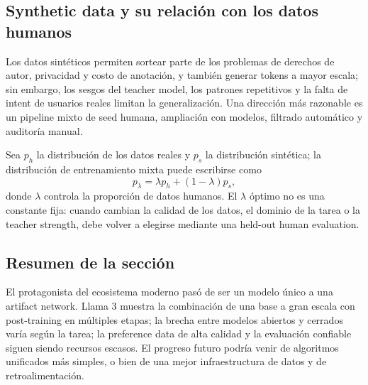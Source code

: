 
\subsection{Synthetic data y su relación con los datos humanos}

Los datos sintéticos permiten sortear parte de los problemas de derechos de autor, privacidad y costo de anotación, y también generar tokens a mayor escala; sin embargo, los sesgos del teacher model, los patrones repetitivos y la falta de intent de usuarios reales limitan la generalización. Una dirección más razonable es un pipeline mixto de seed humana, ampliación con modelos, filtrado automático y auditoría manual.

Sea $p_h$ la distribución de los datos reales y $p_s$ la distribución sintética; la distribución de entrenamiento mixta puede escribirse como
\[
p_{\lambda}=\lambda p_h+(1-\lambda)p_s,
\]
donde $\lambda$ controla la proporción de datos humanos. El $\lambda$ óptimo no es una constante fija: cuando cambian la calidad de los datos, el dominio de la tarea o la teacher strength, debe volver a elegirse mediante una held-out human evaluation.


\subsection{Resumen de la sección}

El protagonista del ecosistema moderno pasó de ser un modelo único a una artifact network. Llama 3 muestra la combinación de una base a gran escala con post-training en múltiples etapas; la brecha entre modelos abiertos y cerrados varía según la tarea; la preference data de alta calidad y la evaluación confiable siguen siendo recursos escasos. El progreso futuro podría venir de algoritmos unificados más simples, o bien de una mejor infraestructura de datos y de retroalimentación.
